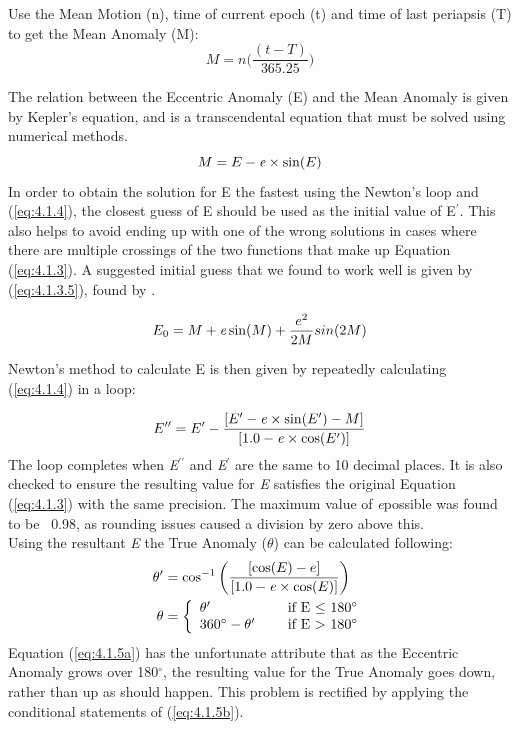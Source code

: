 \documentclass[10pt,preprint]{aastex}
\begin{document}
Use the Mean Motion (n), time of current epoch (t) and time of last periapsis (T) to get the Mean Anomaly (M):
\begin{equation}\label{eq:4.1.2}
M = n \bigg( \frac{(t-T)}{365.25} \bigg)
\end{equation}

The relation between the Eccentric Anomaly (E) and the Mean Anomaly is given by Kepler's equation, and is a transcendental equation that must be solved using numerical methods.
\begin{equation}\label{eq:4.1.3}
M = E - {\it e}\times\sin(E)
\end{equation}
In order to obtain the solution for E the fastest using the Newton's loop and (\ref{eq:4.1.4}), the closest guess of E should be used as the initial value of E$^{\prime}$.  This also helps to avoid ending up with one of the wrong solutions in cases where there are multiple crossings of the two functions that make up Equation (\ref{eq:4.1.3}).  A suggested initial guess that we found to work well is given by (\ref{eq:4.1.3.5}), found by \citep{Argyle}.

\begin{equation}\label{eq:4.1.3.5}
E_0 = M+{\it e}\sin(M) + \frac{e^2}{2M}sin(2M)
\end{equation}

Newton's method to calculate E is then given by repeatedly calculating (\ref{eq:4.1.4}) in a loop:
  
\begin{equation}\label{eq:4.1.4}
E^{\prime \prime} = E^{\prime} - \frac{[E^{\prime} - {\it e} \times \sin(E^{\prime}) - M]}{[1.0 - {\it e} \times \cos(E^{\prime})]}
\end{equation}
The loop completes when {\it E$^{\prime \prime}$} and {\it E$^{\prime}$} are the same to 10 decimal places.  It is also checked to ensure the resulting value for {\it E} satisfies the original Equation (\ref{eq:4.1.3}) with the same precision.  The maximum value of {\it e}possible was found to be ~0.98, as rounding issues caused a division by zero above this.\\

Using the resultant {\it E} the True Anomaly ($\theta$) can be calculated following:
\begin{subequations}
\begin{align}
\label{eq:4.1.5a}
\theta^{\prime}& = \cos^{-1} \bigg( \frac{[\cos(E) - e]}{[1.0 -{\it e}\times \cos(E)]} \bigg)\\
\label{eq:4.1.5b}
\theta& = \left\{ \begin{array}{l l} \theta^{\prime}& \quad \text{ if E $\leq$ 180$^{\circ}$}\\ 360^{\circ}  - \theta^{\prime}& \quad \text{ if E $>$ 180$^{\circ}$} \end{array}\right.
\end{align}
\end{subequations}
Equation (\ref{eq:4.1.5a}) has the unfortunate attribute that as the Eccentric Anomaly grows over 180$^{\circ}$, the resulting value for the True Anomaly goes down, rather than up as should happen.  This problem is rectified by applying the conditional statements of (\ref{eq:4.1.5b}).\\  
\end{document}
